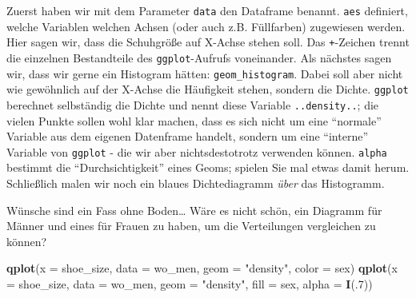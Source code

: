 \documentclass[12pt,ngerman,]{book}
\makeatletter
\newenvironment{Shaded}{\begin{snugshade}}{\end{snugshade}}
\newcommand{\KeywordTok}[1]{\textcolor[rgb]{0.13,0.29,0.53}{\textbf{{#1}}}}
\newcommand{\DataTypeTok}[1]{\textcolor[rgb]{0.13,0.29,0.53}{{#1}}}
\newcommand{\DecValTok}[1]{\textcolor[rgb]{0.00,0.00,0.81}{{#1}}}
\newcommand{\StringTok}[1]{\textcolor[rgb]{0.31,0.60,0.02}{{#1}}}
\newcommand{\NormalTok}[1]{{#1}}
\newenvironment{kframe}{%
\medskip{}
\setlength{\fboxsep}{.8em}
 \def\at@end@of@kframe{}%
 \ifinner\ifhmode%
  \def\at@end@of@kframe{\end{minipage}}%
  \begin{minipage}{\columnwidth}%
 \fi\fi%
 \def\FrameCommand##1{\hskip\@totalleftmargin \hskip-\fboxsep
 \colorbox{shadecolor}{##1}\hskip-\fboxsep
     \hskip-\linewidth \hskip-\@totalleftmargin \hskip\columnwidth}%
 \MakeFramed {\advance\hsize-\width
   \@totalleftmargin\z@ \linewidth\hsize
   \@setminipage}}%
 {\par\unskip\endMakeFramed%
 \at@end@of@kframe}
\renewenvironment{Shaded}{\begin{kframe}}{\end{kframe}}
\makeatother
\begin{document}
Zuerst haben wir mit dem Parameter \texttt{data} den Dataframe benannt.
\texttt{aes} definiert, welche Variablen welchen Achsen (oder auch z.B.
Füllfarben) zugewiesen werden. Hier sagen wir, dass die Schuhgröße auf
X-Achse stehen soll. Das \texttt{+}-Zeichen trennt die einzelnen
Bestandteile des \texttt{ggplot}-Aufrufs voneinander. Als nächstes sagen
wir, dass wir gerne ein Histogram hätten: \texttt{geom\_histogram}.
Dabei soll aber nicht wie gewöhnlich auf der X-Achse die Häufigkeit
stehen, sondern die Dichte. \texttt{ggplot} berechnet selbständig die
Dichte und nennt diese Variable \texttt{..density..}; die vielen Punkte
sollen wohl klar machen, dass es sich nicht um eine ``normale'' Variable
aus dem eigenen Datenframe handelt, sondern um eine ``interne'' Variable
von \texttt{ggplot} - die wir aber nichtsdestotrotz verwenden können.
\texttt{alpha} bestimmt die ``Durchsichtigkeit'' eines Geoms; spielen
Sie mal etwas damit herum. Schließlich malen wir noch ein blaues
Dichtediagramm \emph{über} das Histogramm.

Wünsche sind ein Fass ohne Boden\ldots{} Wäre es nicht schön, ein
Diagramm für Männer und eines für Frauen zu haben, um die Verteilungen
vergleichen zu können?

\begin{Shaded}
\begin{Highlighting}[]
\KeywordTok{qplot}\NormalTok{(}\DataTypeTok{x =} \NormalTok{shoe_size, }\DataTypeTok{data =} \NormalTok{wo_men, }\DataTypeTok{geom =} \StringTok{"density"}\NormalTok{, }\DataTypeTok{color =} \NormalTok{sex)}
\KeywordTok{qplot}\NormalTok{(}\DataTypeTok{x =} \NormalTok{shoe_size, }\DataTypeTok{data =} \NormalTok{wo_men, }\DataTypeTok{geom =} \StringTok{"density"}\NormalTok{, }\DataTypeTok{fill =} \NormalTok{sex, }
      \DataTypeTok{alpha =} \KeywordTok{I}\NormalTok{(.}\DecValTok{7}\NormalTok{))}
\end{Highlighting}
\end{Shaded}
\end{document}
